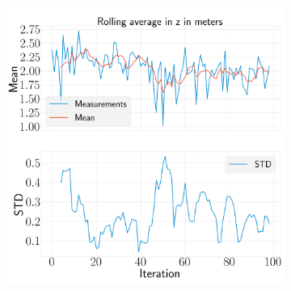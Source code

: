 \documentclass[../Head/report.tex]{subfiles}
\begin{document}
\begin{figure}[H]
\begin{subfigure}[t]{.30\textwidth}
        \caption{}
        \label{fig:GPS2Vision_pose_estimation_test2_roll}
    \end{subfigure}
     \hspace{0.2em}
    \begin{subfigure}[t]{.30\textwidth}
        \centering
        \includegraphics[width=\textwidth]{../Figures/analyse_rolling_average/test2/Calculated_rolling_average_in_z_with_mean_and_STD.png}
        \caption{}
        \label{fig:GPS2Vision_pose_estimation_test2_roll}
    \end{subfigure}
    \caption{}
    \label{fig:GPS2Vision_pose_estimation_test2_error_ori}
\end{figure}
\end{document}
